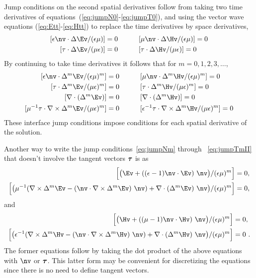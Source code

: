 Jump conditions on the second spatial derivatives follow from taking two time derivatives
of equations~(\ref{eq:jumpN0}-\ref{eq:jumpT0}), and using the vector wave equations (\ref{eq:Ett}-\ref{eq:Htt})
to replace the time derivatives by space derivatives,
\begin{alignat}{3}
  [ \epsilon\nv\cdot\Delta \Ev/(\epsilon\mu)] & =0 
       &\qquad& [\mu \nv\cdot\Delta\Hv/(\epsilon\mu)] =0   \label{eq:jumpN2}\\
  [ \tau\cdot\Delta \Ev/(\mu\epsilon)] &=0 &\qquad& [ \tau\cdot\Delta\Hv/(\mu\epsilon) ] =0    \label{eq:jumpT2}
\end{alignat}
% 
By continuing to take time derivatives it follows that for $m=0,1,2,3,\ldots$, 
\begin{alignat}{3}
  [ \epsilon\nv\cdot\Delta^m \Ev/(\epsilon\mu)^m] & =0  
          &\qquad& [\mu \nv\cdot\Delta^m\Hv/(\epsilon\mu)^m] =0 \label{eq:jumpNm}\\
  [ \tau\cdot\Delta^m \Ev/(\mu\epsilon)^m] &=0 
          &\qquad& [ \tau\cdot\Delta^m\Hv/(\mu\epsilon)^m ] =0    \label{eq:jumpTm} \\
  [ \Div(\Delta^m\Ev)] & =0               &\qquad& [\Div(\Delta^m\Hv)] =0  \\
  [ \mu^{-1}\tau\cdot\curl\Delta^m\Ev/(\mu\epsilon)^m] &=0    
          &\qquad& [ \epsilon^{-1}\tau\cdot\curl\Delta^m\Hv/(\mu\epsilon)^m ] =0  \label{eq:jumpTmII}
\end{alignat}
These interface jump conditions impose conditions for each spatial derivative of the solution.

Another way to write the jump conditions~\eqref{eq:jumpNm} through ~\eqref{eq:jumpTmII} that
doesn't involve the tangent vectors $\boldsymbol{\tau}$ is as 
\begin{align}
  \Big[ \big(\Ev  + ( (\epsilon-1) \nv\cdot\Ev )~\nv\big)/(\epsilon\mu)^m \Big] &=0, \\
  \Big[ \big(\mu^{-1}(\curl\Delta^m\Ev - (\nv\cdot \curl\Delta^m\Ev)~\nv)
             + \Div(\Delta^m\Ev)~\nv  \big)/(\epsilon\mu)^m \Big] &=0,
\end{align}
and 
\begin{align}
  \Big[ \big(\Hv  + ( (\mu-1) \nv\cdot\Hv )~\nv\big)/(\epsilon\mu)^m \Big] &=0 , \\
  \Big[ \big(\epsilon^{-1}(\curl\Delta^m\Hv - (\nv\cdot \curl\Delta^m\Hv)~\nv )
             + \Div(\Delta^m\Hv)~\nv  \big)/(\epsilon\mu)^m \Big] &=0 ~.
\end{align}
The former equations follow by taking the dot product of the above equations with $\nv$ or $\boldsymbol{\tau}$. 
This latter form may be convenient for discretizing the equations since there is no
need to define tangent vectors. 

